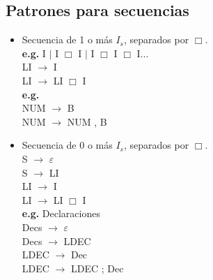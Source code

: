 \documentclass[\main/ApuntesPL.tex]{subfiles}
\begin{document}
    \subsection{Patrones para secuencias}
      \begin{itemize}
        \item Secuencia de 1 o más $I_s$, separados por $\Box$.\\
            \hspace{3mm}\textbf{e.g.} I $\mid$ I $\Box$ I $\mid$ I $\Box$ I $\Box$ I...\\
            \vspace{2mm}
            \hspace{3mm}LI $\rightarrow$ I\\
            \hspace{3mm}LI $\rightarrow$ LI $\Box$ I\\
            \vspace{2mm}
            \hspace{3mm}\textbf{e.g.}\\
            \hspace{3mm}NUM $\rightarrow$ B\\
            \hspace{3mm}NUM $\rightarrow$ NUM , B
        \item Secuencia de 0 o más $I_s$, separados por $\Box$.\\
            \hspace{3mm}S $\rightarrow$ $\varepsilon$\\
            \hspace{3mm}S $\rightarrow$ LI\\
            \hspace{3mm}LI $\rightarrow$ I\\
            \hspace{3mm}LI $\rightarrow$ LI $\Box$ I\\
            \vspace{2mm}
            \hspace{3mm}\textbf{e.g.} Declaraciones\\
            \hspace{3mm}Decs $\rightarrow$ $\varepsilon$\\
            \hspace{3mm}Decs $\rightarrow$ LDEC\\
            \hspace{3mm}LDEC $\rightarrow$ Dec\\
            \hspace{3mm}LDEC $\rightarrow$ LDEC ; Dec
      \end{itemize}
\end{document}
